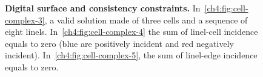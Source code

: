\begin{figure}
\center
\hspace{0.5em}
\hspace{0.5em}
\caption{\textbf{Digital surface and consistency constraints.} In~\cref{ch4:fig:cell-complex-3}, a valid solution made of three cells and a sequence of eight linels. In~\cref{ch4:fig:cell-complex-4} the sum of linel-cell incidence equals to zero (blue are positively incident and red negatively incident). In~\cref{ch4:fig:cell-complex-5}, the sum of linel-edge incidence equals to zero.}
\label{ch4:fig:schoenemann-consistency-constraints}
\end{figure}

